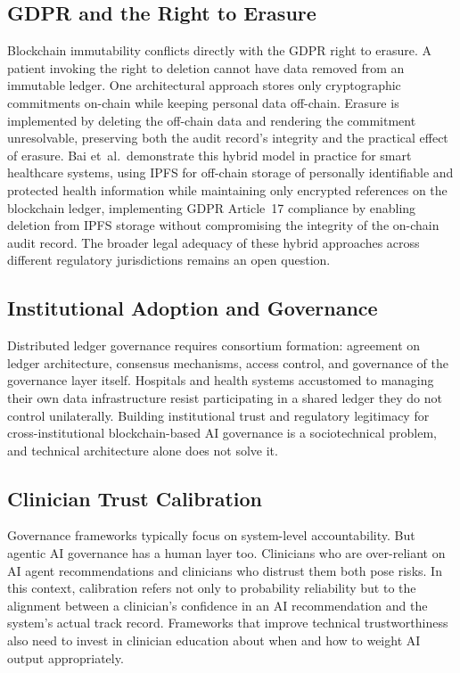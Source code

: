 \documentclass[12pt,a4paper]{article}
\begin{document}
\subsection*{GDPR and the Right to Erasure}

Blockchain immutability conflicts directly with the GDPR right to
erasure. A patient invoking the right to deletion cannot have
data removed from an immutable ledger. One architectural approach
stores only cryptographic commitments on-chain while keeping
personal data off-chain. Erasure is implemented by deleting the
off-chain data and rendering the commitment unresolvable,
preserving both the audit record's integrity and the practical
effect of erasure. Bai et~al.\ demonstrate this hybrid model in
practice for smart healthcare systems, using IPFS for off-chain
storage of personally identifiable and protected health
information while maintaining only encrypted references on the
blockchain ledger, implementing GDPR Article~17 compliance by
enabling deletion from IPFS storage without compromising the
integrity of the on-chain audit record.\cite{bai2022} The broader
legal adequacy of these hybrid approaches across different
regulatory jurisdictions remains an open question.

\subsection*{Institutional Adoption and Governance}

Distributed ledger governance requires consortium formation:
agreement on ledger architecture, consensus mechanisms, access
control, and governance of the governance layer itself. Hospitals
and health systems accustomed to managing their own data
infrastructure resist participating in a shared ledger they do
not control unilaterally. Building institutional trust and
regulatory legitimacy for cross-institutional blockchain-based AI
governance is a sociotechnical problem, and technical
architecture alone does not solve it.

\subsection*{Clinician Trust Calibration}

Governance frameworks typically focus on system-level
accountability. But agentic AI governance has a human layer too.
Clinicians who are over-reliant on AI agent recommendations and
clinicians who distrust them both pose risks. In this context,
calibration refers not only to probability reliability but to the
alignment between a clinician's confidence in an AI
recommendation and the system's actual track record. Frameworks
that improve technical trustworthiness also need to invest in
clinician education about when and how to weight AI output
appropriately.
\end{document}
